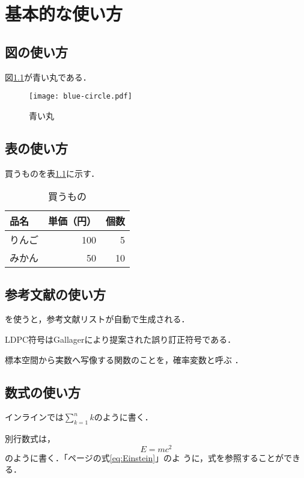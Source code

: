 \chapter{基本的な使い方}

\section{図の使い方}

図\ref{fig:青い丸}が青い丸である．

\begin{figure}[htbp]
 \centering
 \texttt{[image: blue-circle.pdf]}
 \caption{青い丸}
 \label{fig:青い丸}
\end{figure}

\section{表の使い方}

買うものを表\ref{table:買うもの}に示す．

\begin{table}[htbp]
 \caption{買うもの}
 \label{table:買うもの}
 \centering
 \begin{tabular}{lrr}
  \hline
  品名   & 単価（円） & 個数 \\
  \hline
  りんご & 100        & 5    \\
  みかん & 50         & 10   \\
  \hline
 \end{tabular}
\end{table}

\section{参考文献の使い方}

\BibTeX{}を使うと，参考文献リストが自動で生成される．

LDPC符号はGallagerにより提案された誤り訂正符号である\cite{gallager}．

標本空間から実数へ写像する関数のことを，確率変数と呼ぶ
\cite[p.20~Definition~2.1]{mitzenmacher}．

\section{数式の使い方}

インラインでは$\sum_{k = 1}^n k$のように書く．

別行数式は，
\begin{equation}
 E = mc^2 \label{eq:Einstein}
\end{equation}
のように書く．「\pageref{eq:Einstein}ページの式\eqref{eq:Einstein}」のよ
うに，式を参照することができる．

